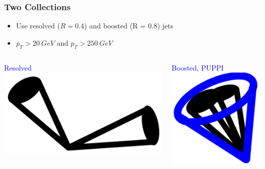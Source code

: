 \documentclass{beamer}
\begin{document}
\begin{frame}
  \frametitle{Two Collections}

  \begin{itemize}
  \item Use resolved ($R = 0.4$) and boosted (R = 0.8) jets
  \item $p_T > \SI{20}{GeV}$ and $p_T > \SI{250}{GeV}$
  \end{itemize}

  \begin{columns}
    \begin{column}{0.5\linewidth}
      \centering
      \textcolor{blue}{Resolved} \\
      \includegraphics[width=\linewidth]{figures/resolved.pdf}
    \end{column}
    \begin{column}{0.5\linewidth}
      \centering
      \textcolor{blue}{Boosted, PUPPI} \\
      \includegraphics[width=0.6\linewidth]{figures/boosted.pdf}
    \end{column}
  \end{columns}

\end{frame}
\end{document}
